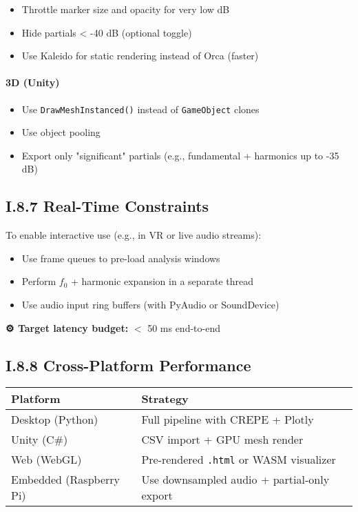 \begin{itemize}
    \item Throttle marker size and opacity for very low dB
    \item Hide partials < -40 dB (optional toggle)
    \item Use Kaleido for static rendering instead of Orca (faster)
\end{itemize}

\paragraph{3D (Unity)}

\begin{itemize}
    \item Use \texttt{DrawMeshInstanced()} instead of \texttt{GameObject} clones
    \item Use object pooling
    \item Export only "significant" partials (e.g., fundamental + harmonics up to -35 dB)
\end{itemize}

\subsection*{I.8.7 Real-Time Constraints}

To enable interactive use (e.g., in VR or live audio streams):

\begin{itemize}
    \item Use frame queues to pre-load analysis windows
    \item Perform $f_0$ + harmonic expansion in a separate thread
    \item Use audio input ring buffers (with PyAudio or SoundDevice)
\end{itemize}

\textbf{⚙️ Target latency budget:} $<$ 50 ms end-to-end

\subsection*{I.8.8 Cross-Platform Performance}

\begin{center}
\begin{tabular}{|l|p{10cm}|}
\hline
\textbf{Platform} & \textbf{Strategy} \\
\hline
Desktop (Python) & Full pipeline with CREPE + Plotly \\
Unity (C\#) & CSV import + GPU mesh render \\
Web (WebGL) & Pre-rendered \texttt{.html} or WASM visualizer \\
Embedded (Raspberry Pi) & Use downsampled audio + partial-only export \\
\hline
\end{tabular}
\end{center}

